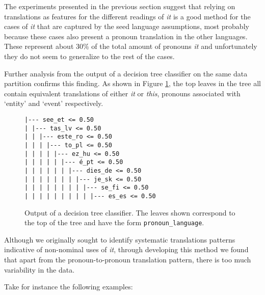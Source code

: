 \documentclass[10pt, a4paper]{article}
\begin{document}
The experiments presented in the previous section suggest that relying on 
translations as features for the different readings of \textit{it} is a good 
method for 
the cases of \textit{it} that are captured by the seed language assumptions, 
most probably because  
these cases also present a pronoun translation in the other languages. These 
represent about 30\% of the total amount of pronouns 
\textit{it} and unfortunately they do not seem to generalize to the rest of the 
cases. 

Further analysis from the output of a decision tree classifier on the same data 
partition confirms this finding. As shown in Figure \ref{fig:decisiontree}, the 
top leaves in the tree all contain equivalent translations of either \textit{it} or 
\textit{this}, pronouns associated with `entity' and `event' respectively. 


\begin{figure}\small
\begin{verbatim}
|--- see_et <= 0.50
| |--- tas_lv <= 0.50
| | |--- este_ro <= 0.50
| | | |--- to_pl <= 0.50
| | | | |--- ez_hu <= 0.50
| | | | | |--- é_pt <= 0.50
| | | | | | |--- dies_de <= 0.50
| | | | | | | |--- je_sk <= 0.50
| | | | | | | | |--- se_fi <= 0.50
| | | | | | | | | |--- es_es <= 0.50
\end{verbatim}
\caption{Output of a decision tree classifier. The leaves shown correspond to
the top of the tree and have the form \texttt{pronoun\_language}.}\label{fig:decisiontree}
\end{figure}




Although we originally sought to identify systematic translations patterns 
indicative of non-nominal uses of \textit{it}, through 
developing this method we found that apart from the pronoun-to-pronoun 
translation pattern, there is too much variability in the data. 

Take for instance the following examples:
\end{document}
